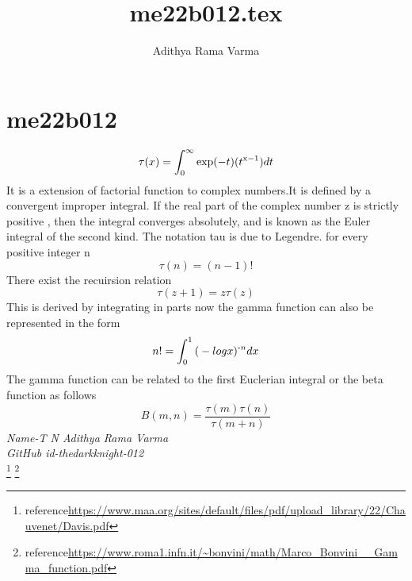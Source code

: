\documentclass[12pt,a4paper]{article}
\author{Adithya Rama Varma}
\title{\textbf{me22b012.tex}}
\begin{document}
\maketitle

\section{me22b012 }
\begin{equation}
{\tau}(x)=\int_{0}^{\infty}{\text{exp}(-t)}{\text (t^{\text x-1})dt}
\end{equation}
It is a extension of factorial function to complex numbers.It is defined by a convergent improper integral.
If the real part of the complex number z is strictly positive , then the integral converges absolutely, and is known as the Euler integral of the second kind.
The notation tau is due to Legendre.
for every positive integer n
\begin{equation}
{\tau}(n)=(n-1)!
\end{equation}
There exist the recuirsion relation 
\begin{equation}
{\tau}(z+1)=z{\tau}(z)
\end{equation}
This is derived by integrating in parts
now the gamma function can also be represented in the form 
\begin{equation}
n!=\int_{0}^{1}{\text (- log x)^{\text -n}dx}
\end{equation}
The gamma function can be related to the first Euclerian integral or the beta function as follows
\begin{equation}
B(m,n)=\frac {{\tau}(m) {\tau}(n)}{{\tau}(m+n)}
\end{equation}
\emph{Name-T N Adithya Rama Varma }\\
\emph{GitHub id-thedarkknight-012}\\
\footnote{reference\url{https://www.maa.org/sites/default/files/pdf/upload_library/22/Chauvenet/Davis.pdf}}
\footnote{reference\url{https://www.roma1.infn.it/~bonvini/math/Marco_Bonvini__Gamma_function.pdf}}
\end{document}
